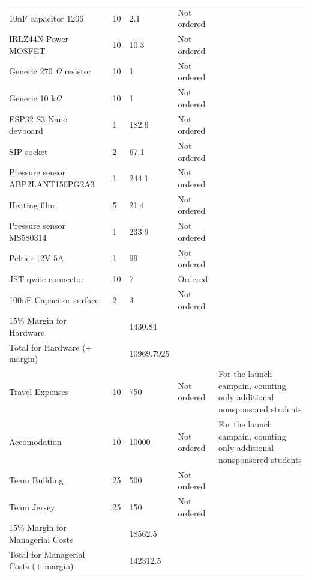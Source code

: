 \begin{longtable}{p{3cm}p{1.7cm}p{1.5cm}p{3cm}p{5cm}}
10nF capacitor 1206 & 10 & 2.1 & Not ordered &  \\
IRLZ44N Power MOSFET & 10 & 10.3 & Not ordered &  \\
Generic 270 $\Omega$ resistor & 10 & 1 & Not ordered &  \\
Generic 10 k$\Omega$ & 10 & 1 & Not ordered &  \\
ESP32 S3 Nano devboard & 1 & 182.6 & Not ordered &  \\
SIP socket & 2 & 67.1 & Not ordered &  \\
Pressure sensor ABP2LANT150PG2A3 & 1 & 244.1 & Not ordered &  \\
Heating film & 5 & 21.4 & Not ordered &  \\
Pressure sensor MS580314 & 1 & 233.9 & Not ordered &  \\
Peltier 12V 5A & 1 & 99 & Not ordered &  \\
JST qwiic connector & 10 & 7 & Ordered &  \\
100nF Capacitor surface & 2 & 3 & Not ordered &  \\
\hline
15\% Margin for Hardware & & 1430.84 & & \\
Total for Hardware (+ margin) & & 10969.7925 & & \\
\hline
Travel Expenses & 10 & 750 & Not ordered & For the launch campain, counting only additional nonsponsored students \\
Accomodation & 10 & 10000 & Not ordered & For the launch campain, counting only additional nonsponsored students \\
Team Building & 25 & 500 & Not ordered &  \\
Team Jersey & 25 & 150 & Not ordered &  \\
\hline
15\% Margin for Managerial Costs & & 18562.5 & & \\
Total for Managerial Costs (+ margin) & & 142312.5 & & \\
\end{longtable}


